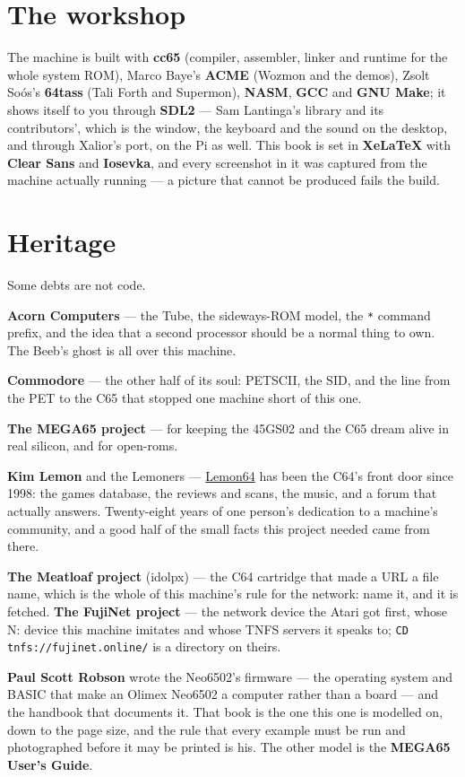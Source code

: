 \section{The workshop}
The machine is built with \textbf{cc65} (compiler, assembler, linker
and runtime for the whole system ROM), Marco Baye's \textbf{ACME}
(Wozmon and the demos), Zsolt Soós's \textbf{64tass} (Tali Forth
and Supermon), \textbf{NASM}, \textbf{GCC} and \textbf{GNU Make}; it shows itself to you through
\textbf{SDL2} --- Sam Lantinga's library and its contributors', which
is the window, the keyboard and the sound on the desktop, and through
Xalior's port, on the Pi as well. This book is set in \textbf{XeLaTeX} with
\textbf{Clear Sans} and \textbf{Iosevka}, and every screenshot in it
was captured from the machine actually running --- a picture that
cannot be produced fails the build.

\section{Heritage}
Some debts are not code.

\textbf{Acorn Computers} --- the Tube, the sideways-ROM model, the
\verb|*| command prefix, and the idea that a second processor should
be a normal thing to own. The Beeb's ghost is all over this machine.

\textbf{Commodore} --- the other half of its soul: PETSCII, the SID,
and the line from the PET to the C65 that stopped one machine short of
this one.

\textbf{The MEGA65 project} --- for keeping the 45GS02 and the C65
dream alive in real silicon, and for open-roms.

\textbf{Kim Lemon} and the Lemoners --- \href{https://www.lemon64.com}{Lemon64}
has been the C64's front door since 1998: the games database, the
reviews and scans, the music, and a forum that actually answers.
Twenty-eight years of one person's dedication to a machine's community,
and a good half of the small facts this project needed came from there.

\textbf{The Meatloaf project} (idolpx) --- the C64 cartridge that made
a URL a file name, which is the whole of this machine's rule for the
network: name it, and it is fetched. \textbf{The FujiNet project} ---
the network device the Atari got first, whose N: device this machine
imitates and whose TNFS servers it speaks to;
\texttt{CD tnfs://fujinet.online/} is a directory on theirs.

\textbf{Paul Scott Robson} wrote the Neo6502's firmware --- the
operating system and BASIC that make an Olimex Neo6502 a computer
rather than a board --- and the handbook that documents it. That book
is the one this one is modelled on, down to the page size, and the rule
that every example must be run and photographed before it may be
printed is his. The other model is the \textbf{MEGA65 User's Guide}.

